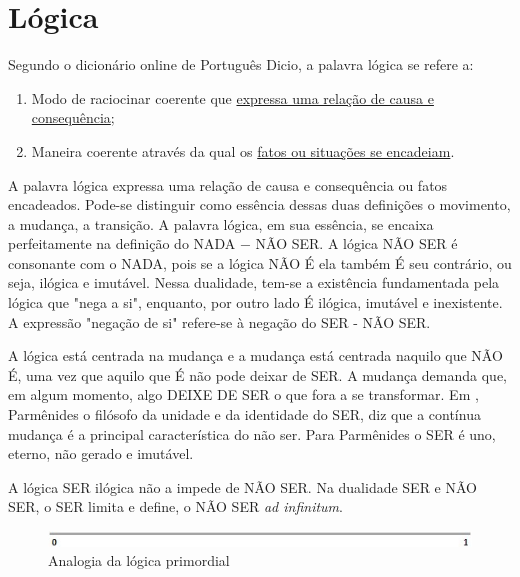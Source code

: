 \section{Lógica}
Segundo o dicionário online de Português Dicio\cite{dicio_logica}, a palavra lógica se refere a:
	\begin{enumerate}
	   \item Modo de raciocinar coerente que \underline{expressa uma relação de causa e consequência};
	   \item Maneira coerente através da qual os \underline{fatos ou situações se encadeiam}. 
	\end{enumerate}
 
\bigbreak
A palavra lógica expressa uma relação de causa e consequência ou fatos encadeados. Pode-se distinguir como essência dessas duas definições o movimento, a mudança, a transição. A palavra lógica, em sua essência, se encaixa perfeitamente na definição do NADA − NÃO SER.  A lógica NÃO SER é consonante com o NADA, pois se a lógica NÃO É ela também É seu contrário, ou seja, ilógica e imutável. Nessa dualidade, tem-se a existência fundamentada pela lógica que "nega a si", enquanto, por outro lado É ilógica, imutável e inexistente. A expressão "negação de si" refere-se à negação do SER - NÃO SER. 

A lógica está centrada na mudança e a mudança está centrada naquilo que NÃO É, uma vez que aquilo que É não pode deixar de SER. A mudança demanda que, em algum momento, algo DEIXE DE SER o que fora a se transformar. Em , Parmênides  o filósofo da unidade e da identidade do SER, diz que a contínua mudança é a principal característica do não ser. Para Parmênides o SER é uno, eterno, não gerado e imutável.

A lógica SER ilógica não a impede de NÃO SER. Na dualidade SER e NÃO SER, o SER limita e define, o NÃO SER \textit{ad infinitum}.
	\begin{figure}[H]
	\caption{Analogia da lógica primordial}
	\label{fig:primordial_logic_representation}
	\centering
	\includegraphics[scale=1]{sections/images/primordial_logic_representation.jpg}
	\end{figure}

